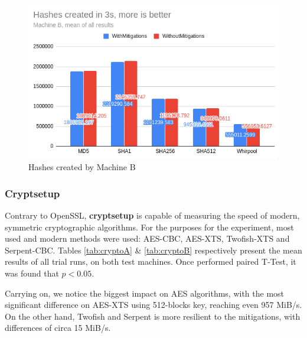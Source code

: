 \documentclass{csfourzero}
\begin{document}
\begin{figure}[!h]
\centering
\includegraphics[width=15cm]{hashB}
\caption{Hashes created by Machine B}
\label{fig:hashB}
\end{figure}


\pagebreak

\subsubsection{Cryptsetup}

Contrary to OpenSSL, \textbf{cryptsetup} is capable of measuring the speed of modern, symmetric cryptographic algorithms. For the purposes for the experiment, most used and modern methods were used: AES-CBC, AES-XTS, Twofish-XTS and Serpent-CBC. Tables \ref{tab:cryptoA} \& \ref{tab:cryptoB} respectively present the mean results of all trial runs, on both test machines. Once performed paired T-Test, it was found that $p < 0.05$.

Carrying on, we notice the biggest impact on AES algorithms, with the most significant difference on AES-XTS using 512-blocks key, reaching even 957 MiB/s. On the other hand, Twofish and Serpent is more resilient to the mitigations, with differences of circa 15 MiB/s. 
\end{document}
